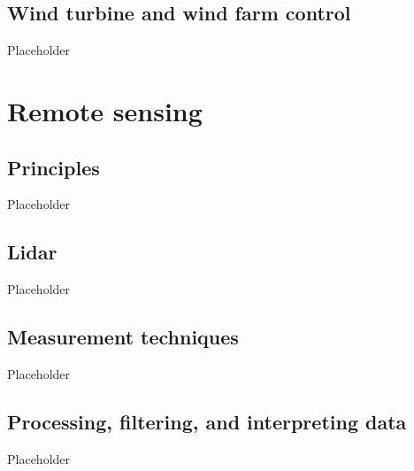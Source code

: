 \clearpage
\subsection{Wind turbine and wind farm control}
\label{sec:intro_control}

Placeholder


\clearpage
\section{Remote sensing}
\label{intro_remote_sensing}

\subsection{Principles}
\label{sec:intro_rs_principles}

Placeholder


\clearpage
\subsection{Lidar}
\label{sec:intro_lidar}

Placeholder


\clearpage
\subsection{Measurement techniques}
\label{sec:intro_meas_tech}

Placeholder


\clearpage
\subsection{Processing, filtering, and interpreting data}
\label{sec:intro_rs_data}

Placeholder

\clearpage